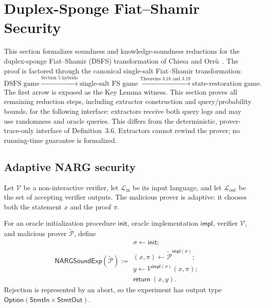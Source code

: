 \section{Duplex-Sponge Fiat--Shamir Security}
\label{sec:duplex_sponge_fiat_shamir_security}

This section formalizes soundness and knowledge-soundness reductions for the
duplex-sponge Fiat--Shamir (DSFS) transformation of Chiesa and Orr\`u~\cite{CO25}.  The proof is
factored through the canonical single-salt Fiat--Shamir transformation:
\[
  \text{DSFS game}
    \xrightarrow{\text{Section 5 hybrids}}
  \text{single-salt FS game}
    \xrightarrow{\text{Theorems 3.18 and 3.19}}
  \text{state-restoration game}.
\]
The first arrow is exposed as the Key Lemma witness.  This section proves all remaining reduction
steps, including extractor construction and query/probability bounds, for the following interface:
extractors receive both query logs and may use randomness and oracle queries. This differs from
the deterministic, prover-trace-only interface of Definition~3.6. Extractors cannot rewind the
prover; no running-time guarantee is formalized.

\subsection{Adaptive NARG security}

Let $\mathcal V$ be a non-interactive verifier, let $\mathcal L_{\mathrm{in}}$ be its input
language, and let $\mathcal L_{\mathrm{out}}$ be the set of accepting verifier outputs.  The
malicious prover is adaptive: it chooses both the statement $x$ and the proof $\pi$.

\begin{definition}
  \label{def:adaptive_narg_soundness_experiment}
  For an oracle initialization procedure $\mathsf{init}$, oracle implementation $\mathsf{impl}$,
  verifier $\mathcal V$, and malicious prover $\widetilde{\mathcal P}$, define
  \[
    \mathsf{NARGSoundExp}(\widetilde{\mathcal P}) :=
    \begin{array}{l}
      \sigma \leftarrow \mathsf{init};\\
      (x,\pi) \leftarrow \widetilde{\mathcal P}^{\mathsf{impl}(\sigma)};\\
      y \leftarrow \mathcal V^{\mathsf{impl}(\sigma)}(x,\pi);\\
      \mathsf{return}\ (x,y).
    \end{array}
  \]
  Rejection is represented by an abort, so the experiment has output type
  $\mathsf{Option}(\mathsf{StmtIn}\times\mathsf{StmtOut})$.
  \leanok
\end{definition}

